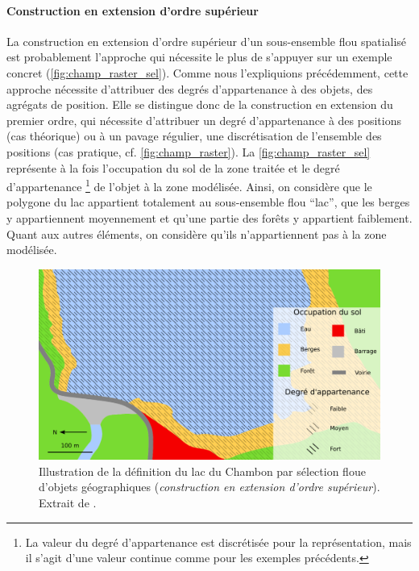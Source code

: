 \paragraph{Construction en extension d'ordre supérieur}

La construction en extension d’ordre supérieur d’un sous-ensemble flou
spatialisé est probablement l’approche qui nécessite le plus de
s’appuyer sur un exemple concret
(\autoref{fig:champ_raster_sel}). Comme nous l’expliquions
précédemment, cette approche nécessite d’attribuer des degrés
d’appartenance à des objets, des agrégats de position. Elle se
distingue donc de la construction en extension du premier ordre, qui
nécessite d’attribuer un degré d’appartenance à des positions (cas
théorique) ou à un pavage régulier, une discrétisation de l’ensemble
des positions (cas pratique, cf. \autoref{fig:champ_raster}). La
\autoref{fig:champ_raster_sel} représente à la fois l’occupation du
sol de la zone traitée et le degré d’appartenance \footnote{La valeur
  du degré d'appartenance est discrétisée pour la représentation, mais
  il s’agit d’une valeur continue comme pour les exemples précédents.}
de l’objet à la zone modélisée. Ainsi, on considère que le polygone du
lac appartient totalement au sous-ensemble flou \enquote{lac}, que les
berges y appartiennent moyennement et qu’une partie des forêts y
appartient faiblement. Quant aux autres éléments, on considère qu’ils
n’appartiennent pas à la zone modélisée.

\begin{figure}
  \centering
  \includegraphics{../figures/fig12.png}
  \caption{Illustration de la définition du lac du Chambon par
    sélection floue d’objets géographiques (\ie \emph{construction en
      extension d’ordre supérieur}). Extrait de \textcite{Bunel2020}.}
  \label{fig:champ_raster_sel}
\end{figure}

